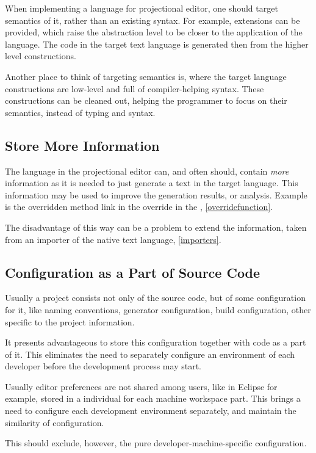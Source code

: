  When implementing a language for projectional editor, one should target semantics of it, rather than an existing syntax.
For example, extensions can be provided, which raise the abstraction level to be closer to the application of the language.
The code in the target text language is generated then from the higher level constructions. 

Another place to think of targeting semantics is, where the target language constructions are low-level and 
full of compiler-helping syntax. These constructions can be cleaned out, helping the programmer to focus on their
semantics, instead of typing and syntax.

\subsection{Store More Information}

 The language in the projectional editor can, and often should, contain \emph{more} information as it is needed 
 to just generate a text in the target language. This information may be used to improve the generation results, or
 analysis. Example is the overridden method link in the override in the \pcpp, \ref{overridefunction}.
 
 The disadvantage of this way can be a problem to extend the information, taken from an importer of the native text language,
 \ref{importers}.

\subsection{Configuration as a Part of Source Code}
 Usually a project consists not only of the source code, but of some configuration for it, like naming conventions, 
 generator configuration, build configuration, other specific to the project information.
 
 It presents advantageous to store this configuration together with code as a part of it. This eliminates the need 
 to separately configure an environment of each developer before the development process may start.

 Usually editor preferences are not shared among users, like in Eclipse for example, stored in a individual for each 
 machine workspace part. This brings a need to configure each development environment separately, and maintain the similarity
 of configuration.
 
 This should exclude, however, the pure developer-machine-specific configuration.

